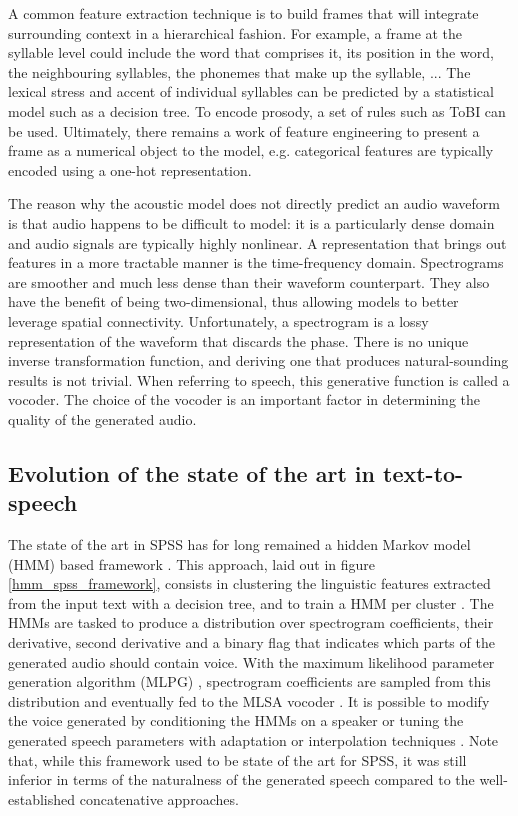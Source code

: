 \documentclass[a4paper, oneside, 12pt, english]{article}
\begin{document}
A common feature extraction technique is to build frames that will integrate surrounding context in a hierarchical fashion. For example, a frame at the syllable level could include the word that comprises it, its position in the word, the neighbouring syllables, the phonemes that make up the syllable, ... The lexical stress and accent of individual syllables can be predicted by a statistical model such as a decision tree. To encode prosody, a set of rules such as ToBI \citep{TOBI} can be used. Ultimately, there remains a work of feature engineering to present a frame as a numerical object to the model, e.g. categorical features are typically encoded using a one-hot representation.

The reason why the acoustic model does not directly predict an audio waveform is that audio happens to be difficult to model: it is a particularly dense domain and audio signals are typically highly nonlinear. A representation that brings out features in a more tractable manner is the time-frequency domain. Spectrograms are smoother and much less dense than their waveform counterpart. They also have the benefit of being two-dimensional, thus allowing models to better leverage spatial connectivity. Unfortunately, a spectrogram is a lossy representation of the waveform that discards the phase. There is no unique inverse transformation function, and deriving one that produces natural-sounding results is not trivial. When referring to speech, this generative function is called a vocoder. The choice of the vocoder is an important factor in determining the quality of the generated audio.



\subsection{Evolution of the state of the art in text-to-speech}
The state of the art in SPSS has for long remained a hidden Markov model (HMM) based framework \citep{Tokuda-2013}. This approach, laid out in figure \ref{hmm_spss_framework}, consists in clustering the linguistic features extracted from the input text with a decision tree, and to train a HMM per cluster \citep{HMMTTS}. The HMMs are tasked to produce a distribution over spectrogram coefficients, their derivative, second derivative and a binary flag that indicates which parts of the generated audio should contain voice. With the maximum likelihood parameter generation algorithm (MLPG) \citep{Tokuda-2000}, spectrogram coefficients are sampled from this distribution and eventually fed to the MLSA vocoder \citep{MLSA}. It is possible to modify the voice generated by conditioning the HMMs on a speaker or tuning the generated speech parameters with adaptation or interpolation techniques \citep{HMMSpeakerInterpolation}. Note that, while this framework used to be state of the art for SPSS, it was still inferior in terms of the naturalness of the generated speech compared to the well-established concatenative approaches.
\end{document}
